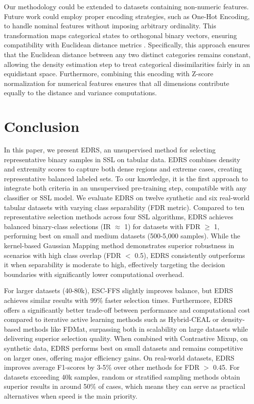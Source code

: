 \documentclass[preprint,12pt]{elsarticle}
\begin{document}
Our methodology could be extended to datasets containing non-numeric features. Future work could employ proper encoding strategies, such as One-Hot Encoding, to handle nominal features without imposing arbitrary ordinality. This transformation maps categorical states to orthogonal binary vectors, ensuring compatibility with Euclidean distance metrics \cite{hancock2020survey}.  Specifically, this approach ensures that the Euclidean distance between any two distinct categories remains constant, allowing the density estimation step to treat categorical dissimilarities fairly in an equidistant space. Furthermore, combining this encoding with Z-score normalization for numerical features ensures that all dimensions contribute equally to the distance and variance computations.

\section{Conclusion} \label{sec:conclusion} 

In this paper, we present EDRS, an unsupervised method for selecting representative binary samples in SSL on tabular data. EDRS combines density and extremity scores to capture both dense regions and extreme cases, creating representative balanced labeled sets. To our knowledge, it is the first approach to integrate both criteria in an unsupervised pre-training step, compatible with any classifier or SSL model. We evaluate EDRS on twelve synthetic and six real-world tabular datasets with varying class separability (FDR metric). Compared to ten representative selection methods across four SSL algorithms, EDRS achieves balanced binary-class selections (IR $\approx$ 1) for datasets with FDR $\geq$ 1, performing best on small and medium datasets (500-5,000 samples). While the kernel-based Gaussian Mapping method demonstrates superior robustness in scenarios with high class overlap (FDR $<$ 0.5), EDRS consistently outperforms it when separability is moderate to high, effectively targeting the decision boundaries with significantly lower computational overhead.

For larger datasets (40-80k), ESC-FFS slightly improves balance, but EDRS achieves similar results with 99\% faster selection times. Furthermore, EDRS offers a significantly better trade-off between performance and computational cost compared to iterative active learning methods such as Hybrid-CEAL or density-based methods like FDMat, surpassing both in scalability on large datasets while delivering superior selection quality. When combined with Contrastive Mixup, on synthetic data, EDRS performs best on small datasets and remains competitive on larger ones, offering major efficiency gains. On real-world datasets, EDRS improves average F1-scores by 3-5\% over other methods for FDR $>$ 0.45. For datasets exceeding 40k samples, random or stratified sampling {\color{blue}methods} obtain superior results in around 50\% of cases, which means they can serve as practical alternatives when speed is the main priority.
\end{document}
